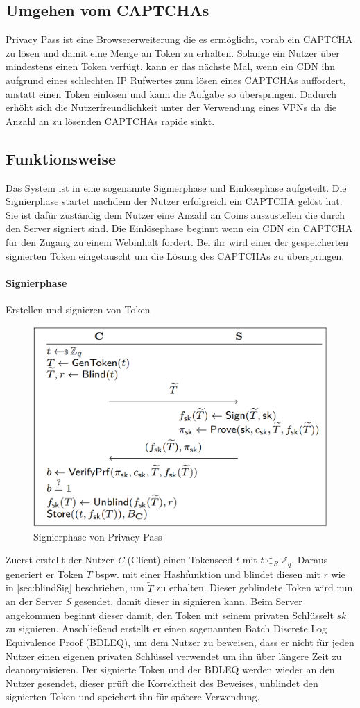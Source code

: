 \documentclass[11pt,a4paper]{scrreprt}
\begin{document}
\subsection{Umgehen vom CAPTCHAs}
Privacy Pass ist eine Browsererweiterung die es ermöglicht, vorab ein CAPTCHA zu lösen und damit eine Menge an Token zu erhalten. Solange ein Nutzer über mindestens einen Token verfügt, kann er das nächste Mal, wenn ein CDN ihn aufgrund eines schlechten IP Rufwertes zum lösen eines CAPTCHAs auffordert, anstatt einen Token einlösen und kann die Aufgabe so überspringen. Dadurch erhöht sich die Nutzerfreundlichkeit unter der Verwendung eines VPNs da die Anzahl an zu lösenden CAPTCHAs rapide sinkt. \cite{pp-davidson2018privacy}

\subsection{Funktionsweise}
Das System ist in eine sogenannte Signierphase und Einlösephase aufgeteilt. Die Signierphase startet nachdem der Nutzer erfolgreich ein CAPTCHA gelöst hat. Sie ist dafür zuständig dem Nutzer eine Anzahl an Coins auszustellen die durch den Server signiert sind. Die Einlösephase beginnt wenn ein CDN ein CAPTCHA für den Zugang zu einem Webinhalt fordert. Bei ihr wird einer der gespeicherten signierten Token eingetauscht um die Lösung des CAPTCHAs zu überspringen. 
\paragraph{Signierphase} Erstellen und signieren von Token

\begin{figure}[H]
    \centering
    \includegraphics[width=0.5\linewidth]{pp_signphase.png}
    \caption{Signierphase von Privacy Pass \cite{pp-davidson2018privacy}}
    \label{fig:pp-signingphase}
\end{figure}
Zuerst erstellt der Nutzer \textit{C} (Client) einen Tokenseed $t$ mit $t {\in}_R \mathbb{Z}_q $. Daraus generiert er Token $T$ bspw. mit einer Hashfunktion und blindet diesen mit $r$ wie in \ref{sec:blindSig} beschrieben, um $\widetilde{T}$ zu erhalten. Dieser geblindete Token wird nun an der Server \textit{S} gesendet, damit dieser in signieren kann. Beim Server angekommen beginnt dieser damit, den Token mit seinem privaten Schlüsselt $sk$ zu signieren. Anschließend erstellt er einen sogenannten Batch Discrete Log Equivalence Proof (BDLEQ), um dem Nutzer zu beweisen, dass er nicht für jeden Nutzer einen eigenen privaten Schlüssel verwendet um ihn über längere Zeit zu deanonymisieren. Der signierte Token und der BDLEQ werden wieder an den Nutzer gesendet, dieser prüft die Korrektheit des Beweises, unblindet den signierten Token und speichert ihn für spätere Verwendung. 
\end{document}
